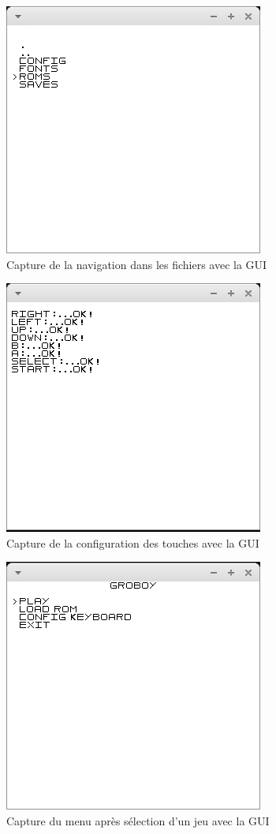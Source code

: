 \documentclass[french]{report}
\begin{document}
\begin{figure}[!h]
\centering
\includegraphics[scale=0.5]{images/screenshot_navigate.png}
\caption{Capture de la navigation dans les fichiers avec la GUI}
\label{GUI2}
\end{figure}

\begin{figure}[!h]
\centering
\includegraphics[scale=0.5]{images/screenshot_config.png}
\caption{Capture de la configuration des touches avec la GUI}
\label{GUI3}
\end{figure}

\begin{figure}[!h]
\centering
\includegraphics[scale=0.5]{images/screenshot_menu2.png}
\caption{Capture du menu après sélection d'un jeu avec la GUI}
\label{GUI4}
\end{figure}
\end{document}
